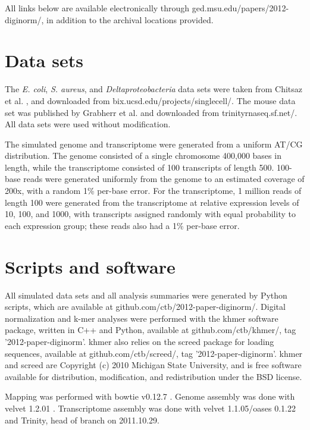 \documentclass{pnastwo}
\begin{document}
\begin{article}
\begin{materials}

All links below are available electronically through
ged.msu.edu/papers/2012-diginorm/, in addition to the
archival locations provided.

\section{Data sets}

The {\em E. coli}, {\em S. aureus}, and {\em Deltaproteobacteria} data
sets were taken from Chitsaz et al. \cite{pubmed21926975}, and
downloaded from bix.ucsd.edu/projects/singlecell/.  The
mouse data set was published by Grabherr et al. \cite{pubmed21572440}
and downloaded from trinityrnaseq.sf.net/.  All data sets
were used without modification.

The simulated genome and transcriptome were generated from a uniform
AT/CG distribution.  The genome consisted of a single chromosome
400,000 bases in length, while the transcriptome consisted of 100
transcripts of length 500.  100-base reads were generated uniformly
from the genome to an estimated coverage of 200x, with a random 1\%
per-base error.  For the transcriptome, 1 million reads of length 100
were generated from the transcriptome at relative expression levels of
10, 100, and 1000, with transcripts assigned randomly with equal
probability to each expression group; these reads also had a 1\%
per-base error.

\section{Scripts and software}

All simulated data sets and all analysis summaries were generated by
Python scripts, which are available at
github.com/ctb/2012-paper-diginorm/.  Digital normalization and k-mer
analyses were performed with the khmer software package, written in
C++ and Python, available at github.com/ctb/khmer/, tag
'2012-paper-diginorm'.  khmer also relies on the screed package for
loading sequences, available at github.com/ctb/screed/, tag
'2012-paper-diginorm'.  khmer and screed are Copyright (c) 2010
Michigan State University, and is free software available for
distribution, modification, and redistribution under the BSD license.

Mapping was performed with bowtie v0.12.7 \cite{pubmed19261174}.
Genome assembly was done with velvet 1.2.01 \cite{pubmed18349386}.
Transcriptome assembly was done with velvet 1.1.05/oases 0.1.22 and
Trinity, head of branch on 2011.10.29.


\end{materials}
\end{article}
\end{document}
